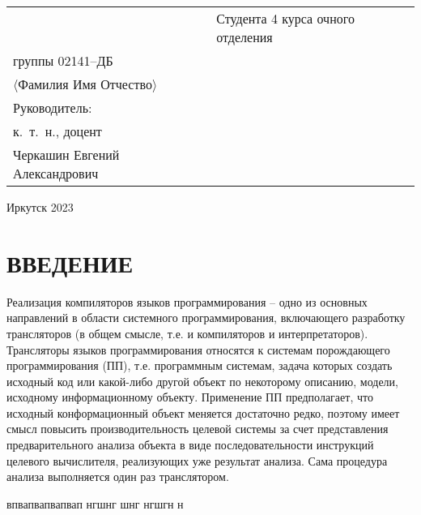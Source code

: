 \documentclass[732,14pt]{studrep}
\begin{document}
\vfill
\noindent\begin{tabularx}{\textwidth} {
  >{\raggedright\arraybackslash}X
  >{\raggedright}X }
&
Студента 4 курса очного отделения\\
группы 02141--ДБ\\
$\langle{}$Фамилия Имя Отчество$\rangle$\\[1em]

Руководитель:\\ %
к.~т.~н., доцент\\[0.5em]
\underline{\hspace{3cm}} Черкашин Евгений Александрович


\end{tabularx}
\vfill
\begin{center}
  Иркутск 2023
\end{center}
\clearpage

\tableofcontents

\chapter*{ВВЕДЕНИЕ}
\label{chap:intro}

Реализация компиляторов языков программирования -- одно из основных направлений в области системного программирования, включающего разработку трансляторов (в общем смысле, т.е. и компиляторов и интерпретаторов).  Трансляторы языков программирования относятся к системам порождающего программирования (ПП), т.е. программным системам, задача которых создать исходный код или какой-либо другой объект по некоторому описанию, модели, исходному информационному объекту.  Применение ПП предполагает, что исходный конформационный объект меняется достаточно редко, поэтому имеет смысл повысить производительность целевой системы за счет представления предварительного анализа объекта в виде последовательности инструкций целевого вычислителя, реализующих уже результат анализа.  Сама процедура анализа выполняется один раз транслятором.



впвапвапвапвап нгшнг шнг нгшгн н
\end{document}
